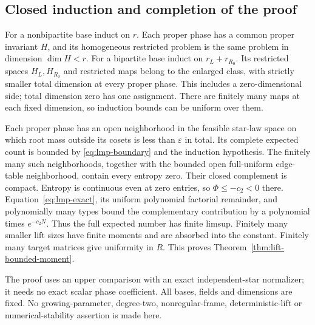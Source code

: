 \subsection{Closed induction and completion of the proof}
For a nonbipartite base induct on $r$. Each proper phase has a common
proper invariant $H$, and its homogeneous restricted problem is the
same problem in dimension $\dim H<r$. For a bipartite base induct on
$r_L+r_{R_0}$. Its restricted spaces $H_L,H_{R_0}$ and restricted
maps belong to the enlarged class, with strictly smaller total
dimension at every proper phase. This includes a zero-dimensional
side; total dimension zero has one assignment. There are finitely
many maps at each fixed dimension, so induction bounds can be uniform
over them.

Each proper phase has an open neighborhood in the feasible star-law
space on which root mass outside its cosets is less than
$\varepsilon$ in total. Its complete expected count is bounded by
\eqref{eq:lmp-boundary} and the induction hypothesis. The finitely
many such neighborhoods, together with the bounded open full-uniform
edge-table neighborhood, contain every entropy zero. Their closed
complement is compact. Entropy is continuous even at zero entries,
so $\Phi\le-c_2<0$ there. Equation~\eqref{eq:lmp-exact}, its uniform
polynomial factorial remainder, and polynomially many types bound
the complementary contribution by a polynomial times $e^{-c_2N}$.
Thus the full expected number has finite limsup. Finitely many
smaller lift sizes have finite moments and are absorbed into the
constant. Finitely many target matrices give uniformity in $R$.
This proves Theorem~\ref{thm:lift-bounded-moment}.

The proof uses an upper comparison with an exact independent-star
normalizer; it needs no exact scalar phase coefficient. All bases,
fields and dimensions are fixed. No growing-parameter, degree-two,
nonregular-frame, deterministic-lift or numerical-stability assertion
is made here.
